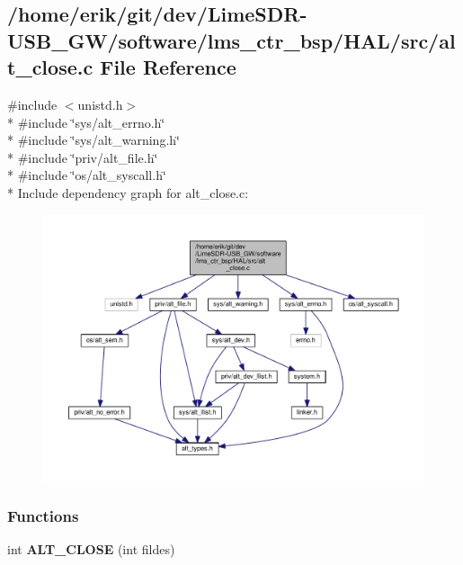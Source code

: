\subsection{/home/erik/git/dev/\+Lime\+S\+D\+R-\/\+U\+S\+B\+\_\+\+G\+W/software/lms\+\_\+ctr\+\_\+bsp/\+H\+A\+L/src/alt\+\_\+close.c File Reference}
\label{alt__close_8c}
{\ttfamily \#include $<$unistd.\+h$>$}\\*
{\ttfamily \#include \char`\"{}sys/alt\+\_\+errno.\+h\char`\"{}}\\*
{\ttfamily \#include \char`\"{}sys/alt\+\_\+warning.\+h\char`\"{}}\\*
{\ttfamily \#include \char`\"{}priv/alt\+\_\+file.\+h\char`\"{}}\\*
{\ttfamily \#include \char`\"{}os/alt\+\_\+syscall.\+h\char`\"{}}\\*
Include dependency graph for alt\+\_\+close.\+c\+:
\nopagebreak
\begin{figure}[H]
\begin{center}
\leavevmode
\includegraphics[width=350pt]{d3/d64/alt__close_8c__incl}
\end{center}
\end{figure}
\subsubsection*{Functions}
\begin{DoxyCompactItemize}
\item 
int {\bf A\+L\+T\+\_\+\+C\+L\+O\+SE} (int fildes)
\end{DoxyCompactItemize}


